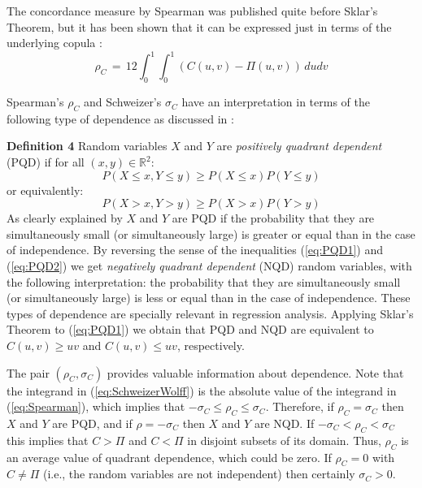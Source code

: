 \documentclass[journal]{vgtc}                %
\begin{document}
The concordance measure by Spearman \cite{Spearman1904} was published quite before Sklar's Theorem, but it has been shown that it can be expressed just in terms of the underlying copula \cite{Nelsen1999}:
\begin{equation}\label{eq:Spearman}
    \rho_C \,=\, 12\int_0^1\!\!\!\int_0^1 (C(u,v) - \Pi(u,v))\,dudv
\end{equation}

Spearman's $\rho_C$ and Schweizer's $\sigma_C$ have an interpretation in terms of the following type of dependence as discussed in \cite{Lehmann1966}:

\textbf{Definition 4} Random variables $X$ and $Y$ are \textit{positively quadrant dependent} (PQD) if for all $(x,y)\in\mathbb{R}^2$:
\begin{equation}\label{eq:PQD1}
    P(X\leq x, Y\leq y) \geq P(X\leq x)P(Y\leq y)
\end{equation}
or equivalently:
\begin{equation}\label{eq:PQD2}
    P(X>x, Y>y) \geq P(X>x)P(Y>y)
\end{equation}
As clearly explained by \cite{Nelsen1999} $X$ and $Y$ are PQD if the probability that they are simultaneously small (or simultaneously large) is greater or equal than in the case of independence. By reversing the sense of the inequalities (\ref{eq:PQD1}) and (\ref{eq:PQD2}) we get \textit{negatively quadrant dependent} (NQD) random variables, with the following interpretation: the probability that they are simultaneously small (or simultaneously large) is less or equal than in the case of independence. These types of dependence are specially relevant in regression analysis. Applying Sklar's Theorem to (\ref{eq:PQD1}) we obtain that PQD and NQD are equivalent to $C(u,v)\geq uv$ and $C(u,v)\leq uv$, respectively.

The pair $(\rho_C,\sigma_C)$ provides valuable information about dependence. Note that the integrand in (\ref{eq:SchweizerWolff}) is the absolute value of the integrand in (\ref{eq:Spearman}), which implies that $-\sigma_C\leq\rho_C\leq\sigma_C.$  Therefore, if $\rho_C=\sigma_C$ then $X$ and $Y$ are PQD, and if $\rho=-\sigma_C$ then $X$ and $Y$ are NQD. If $-\sigma_C<\rho_C<\sigma_C$ this implies that $C>\Pi$ and $C<\Pi$ in disjoint subsets of its domain. Thus, $\rho_C$ is an average value of quadrant dependence, which could be zero. If $\rho_C=0$ with $C\neq\Pi$ (i.e., the random variables are not independent) then certainly $\sigma_C>0$.
\end{document}
